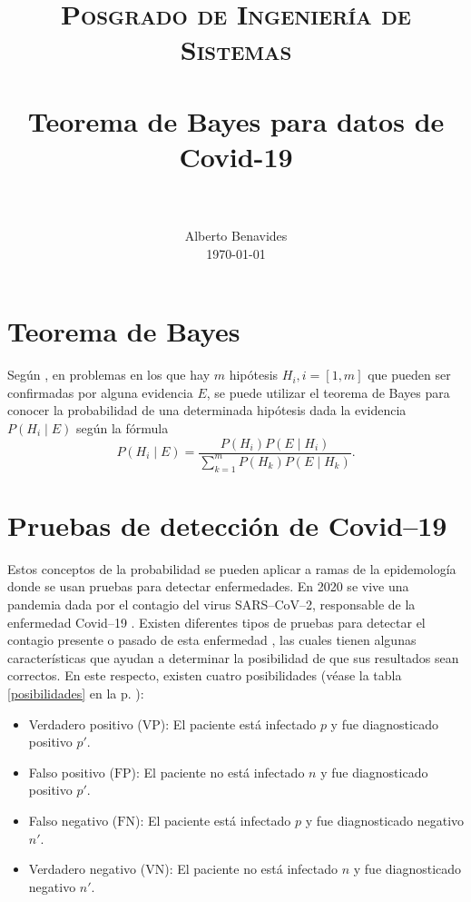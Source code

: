 \documentclass[paper=leter, fontsize=11pt]{scrartcl}
\title{
		\usefont{OT1}{bch}{b}{n}
		\normalfont \normalsize \textsc{Posgrado de Ingeniería de Sistemas} \\ [25pt]
		\horrule{0.5pt} \\[0.4cm]
		\huge Teorema de Bayes para datos de Covid-19 \\
		\horrule{2pt} \\[0.5cm]
}
\author{
		\normalfont 								\normalsize
        Alberto Benavides\\[-3pt]		\normalsize
        \today
}
\date{}
\numberwithin{equation}{section}		%
\numberwithin{figure}{section}			%
\numberwithin{table}{section}				%
\begin{document}
\maketitle

\section{Teorema de Bayes}
Según \citet{grinsteadEA1997}, en problemas en los que hay $m$ hipótesis $H_i, i = [1, m]$ que pueden ser confirmadas por alguna evidencia $E$, se puede utilizar el teorema de Bayes para conocer la probabilidad de una determinada hipótesis dada la evidencia $P(H_i \mid E)$ según la fórmula
\begin{equation}
    \label{bayes}
    P(H_i \mid E) = \frac{P(H_i) P(E \mid H_i)}{\sum_{k = 1}^m P(H_k) P(E \mid H_k)}.
\end{equation}

\section{Pruebas de detección de Covid--19}

Estos conceptos de la probabilidad se pueden aplicar a ramas de la epidemología donde se usan pruebas para detectar enfermedades. En 2020 se vive una pandemia dada por el contagio del virus SARS--CoV--2, responsable de la enfermedad Covid--19 \citep{stat}. Existen diferentes tipos de pruebas para detectar el contagio presente o pasado de esta enfermedad \citep{fda}, las cuales tienen algunas características \citep{ranjan2020} que ayudan a determinar la posibilidad de que sus resultados sean correctos. En este respecto, existen cuatro posibilidades (véase la tabla \ref{posibilidades} en la p. \pageref{posibilidades}):
\begin{itemize}
    \item Verdadero positivo ($\text{VP}$): El paciente está infectado $p$ y fue diagnosticado positivo $p'$.
    \item Falso positivo ($\text{FP}$): El paciente no está infectado $n$ y fue diagnosticado positivo $p'$.
    \item Falso negativo ($\text{FN}$): El paciente está infectado $p$ y fue diagnosticado negativo $n'$.
    \item Verdadero negativo ($\text{VN}$): El paciente no está infectado $n$ y fue diagnosticado negativo $n'$.
\end{itemize}
\end{document}
